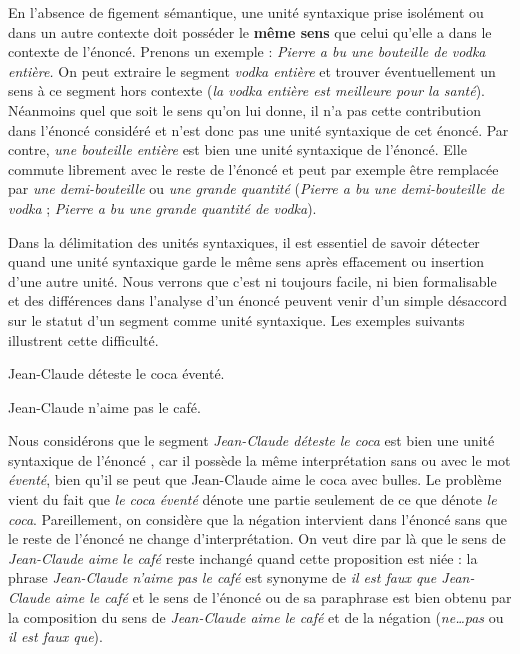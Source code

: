 En l’absence de figement sémantique, une unité syntaxique prise isolément ou dans un autre contexte doit posséder le \textbf{même sens} que celui qu’elle a dans le contexte de l’énoncé. Prenons un exemple : \textit{Pierre a bu une bouteille de vodka entière.} On peut extraire le segment \textit{vodka entière} et trouver éventuellement un sens à ce segment hors contexte (\textit{la vodka entière est meilleure pour la santé}). Néanmoins quel que soit le sens qu’on lui donne, il n’a pas cette contribution dans l’énoncé considéré et n’est donc pas une unité syntaxique de cet énoncé. Par contre, \textit{une bouteille entière} est bien une unité syntaxique de l’énoncé. Elle commute librement avec le reste de l’énoncé et peut par exemple être remplacée par \textit{une demi-bouteille} ou \textit{une grande quantité} (\textit{Pierre a bu une demi-bouteille de vodka} ; \textit{Pierre a bu une grande quantité de vodka}).

Dans la délimitation des unités syntaxiques, il est essentiel de savoir détecter quand une unité syntaxique garde le même sens après effacement ou insertion d’une autre unité. Nous verrons que c’est ni toujours facile, ni bien formalisable et des différences dans l’analyse d’un énoncé peuvent venir d’un simple désaccord sur le statut d’un segment comme unité syntaxique. Les exemples suivants illustrent cette difficulté.

\ea%
    \label{ex:key:1}
          {Jean-Claude}  {déteste}  {le}  {coca}  {éventé.}
\z

\ea%
    \label{ex:key:2}
          {Jean-Claude}  {n’aime}  {pas}  {le}  {café.}
\z

Nous considérons que le segment \textit{Jean-Claude déteste le coca} est bien une unité syntaxique de l’énoncé , car il possède la même interprétation sans ou avec le mot \textit{éventé}, bien qu’il se peut que Jean-Claude aime le coca avec bulles. Le problème vient du fait que \textit{le coca éventé} dénote une partie seulement de ce que dénote \textit{le coca}. Pareillement, on considère que la négation intervient dans l’énoncé  sans que le reste de l’énoncé ne change d’interprétation. On veut dire par là que le sens de \textit{Jean-Claude aime le café} reste inchangé quand cette proposition est niée : la phrase \textit{Jean-Claude n’aime pas le café} est synonyme de \textit{il est faux que Jean-Claude aime le café} et le sens de l’énoncé  ou de sa paraphrase est bien obtenu par la composition du sens de \textit{Jean-Claude aime le café} et de la négation (\textit{ne…pas} ou \textit{il est faux que}).

